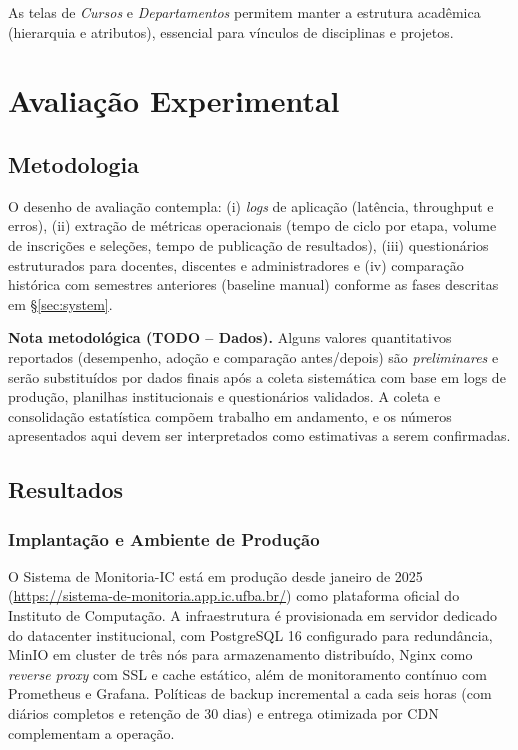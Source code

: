 \documentclass[portuguese]{sbc2025}%
\begin{document}
As telas de \textit{Cursos} e \textit{Departamentos} permitem manter a estrutura acadêmica (hierarquia e atributos), essencial para vínculos de disciplinas e projetos.

\section{Avaliação Experimental}
\label{sec:evaluation}

\subsection{Metodologia}

O desenho de avaliação contempla: (i) \textit{logs} de aplicação (latência, throughput e erros), (ii) extração de métricas operacionais (tempo de ciclo por etapa, volume de inscrições e seleções, tempo de publicação de resultados), (iii) questionários estruturados para docentes, discentes e administradores e (iv) comparação histórica com semestres anteriores (baseline manual) conforme as fases descritas em \S\ref{sec:system}.

\medskip
\noindent\textbf{Nota metodológica (TODO – Dados).} Alguns valores quantitativos reportados (desempenho, adoção e comparação antes/depois) são \textit{preliminares} e serão substituídos por dados finais após a coleta sistemática com base em logs de produção, planilhas institucionais e questionários validados. A coleta e consolidação estatística compõem trabalho em andamento, e os números apresentados aqui devem ser interpretados como estimativas a serem confirmadas.

\subsection{Resultados}

\subsubsection{Implantação e Ambiente de Produção}

O Sistema de Monitoria-IC está em produção desde janeiro de 2025 (\url{https://sistema-de-monitoria.app.ic.ufba.br/}) como plataforma oficial do Instituto de Computação. A infraestrutura é provisionada em servidor dedicado do datacenter institucional, com PostgreSQL 16 configurado para redundância, MinIO em cluster de três nós para armazenamento distribuído, Nginx como \textit{reverse proxy} com SSL e cache estático, além de monitoramento contínuo com Prometheus e Grafana. Políticas de backup incremental a cada seis horas (com diários completos e retenção de 30 dias) e entrega otimizada por CDN complementam a operação.
\end{document}
